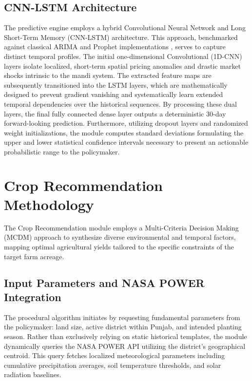 \subsection{CNN-LSTM Architecture}
The predictive engine employs a hybrid Convolutional Neural Network and Long Short-Term Memory (CNN-LSTM) architecture. This approach, benchmarked against classical ARIMA and Prophet implementations \cite{menculini2021comparing}, serves to capture distinct temporal profiles. The initial one-dimensional Convolutional (1D-CNN) layers isolate localized, short-term spatial pricing anomalies and drastic market shocks intrinsic to the mandi system. The extracted feature maps are subsequently transitioned into the LSTM layers, which are mathematically designed to prevent gradient vanishing and systematically learn extended temporal dependencies over the historical sequences. By processing these dual layers, the final fully connected dense layer outputs a deterministic 30-day forward-looking prediction. Furthermore, utilizing dropout layers and randomized weight initializations, the module computes standard deviations formulating the upper and lower statistical confidence intervals necessary to present an actionable probabilistic range to the policymaker.

\section{Crop Recommendation Methodology}

The Crop Recommendation module employs a Multi-Criteria Decision Making (MCDM) approach to synthesize diverse environmental and temporal factors, mapping optimal agricultural yields tailored to the specific constraints of the target farm acreage.

\subsection{Input Parameters and NASA POWER Integration}
The procedural algorithm initiates by requesting fundamental parameters from the policymaker: land size, active district within Punjab, and intended planting season. Rather than exclusively relying on static historical templates, the module dynamically queries the NASA POWER API utilizing the district's geographical centroid. This query fetches localized meteorological parameters including cumulative precipitation averages, soil temperature thresholds, and solar radiation baselines.

